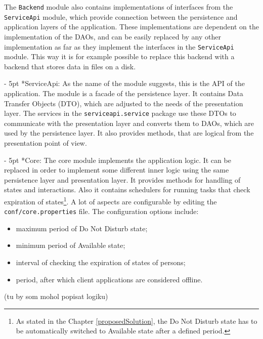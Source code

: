 \documentclass[11pt,singleside]{myfithesis2}
\makeatletter
\renewcommand\paragraph{
   \vspace{-10pt}
   \@startsection{paragraph}{4}{0mm}
      {\baselineskip}
      {- 5pt}
      {\normalfont\normalsize\bfseries}
}
\makeatother
\begin{document}
\begin{sloppypar}
The \texttt{Backend} module also contains implementations of interfaces from the \texttt{ServiceApi} module, which provide connection between the persistence and application layers of the application. These implementations are dependent on the implementation of the DAOs, and can be easily replaced by any other implementation as far as they implement the interfaces in the \texttt{ServiceApi} module. This way it is for example possible to replace this backend with a backend that stores data in files on a disk.
\end{sloppypar}

\begin{sloppypar}
\paragraph*{ServiceApi: } As the name of the module suggests, this is the API of the application. The module is a facade of the persistence layer. It contains Data Transfer Objects (DTO), which are adjusted to the needs of the presentation layer. The services in the \texttt{serviceapi.service} package use these DTOs to communicate with the presentation layer and converts them to DAOs, which are used by the persistence layer. It also provides methods, that are logical from the presentation point of view.
\end{sloppypar}

\paragraph*{Core: } The core module implements the application logic. It can be replaced in order to implement some different inner logic using the same persistence layer and presentation layer. It provides methods for handling of states and interactions. Also it contains schedulers for running tasks that check expiration of states\footnote{As stated in the Chapter \ref{proposedSolution}, the Do Not Disturb state has to be automatically switched to Available state after a defined period.}. A lot of aspects are configurable by editing the \texttt{conf/core.properties} file. The configuration options include:
\begin{itemize}
	\item maximum period of Do Not Disturb state;
	\item minimum period of Available state;
	\item interval of checking the expiration of states of persons;
	\item period, after which client applications are considered offline.
\end{itemize}
(tu by som mohol popisat logiku)
\end{document}
